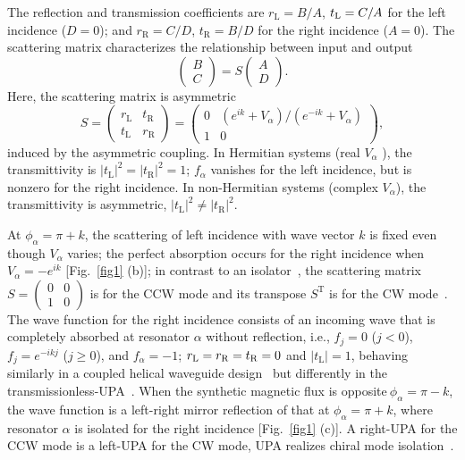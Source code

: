 \documentclass[prl,showpacs,superscriptaddress,twocolumn]{revtex4-1}
\begin{document}
The reflection and transmission coefficients are $r_{\mathrm{L}}=B/A$, $t_{%
\mathrm{L}}=C/A$ for the left incidence ($D=0$); and $r_{\mathrm{R}}=C/D$, $%
t_{\mathrm{R}}=B/D$ for the right incidence ($A=0$). The scattering matrix
characterizes the relationship between input and output~\cite{Jalas,CPAREV}
\begin{equation}
\left(
\begin{array}{c}
B \\
C%
\end{array}%
\right) =S\left(
\begin{array}{c}
A \\
D%
\end{array}%
\right) .  \label{S}
\end{equation}%
Here, the scattering matrix is asymmetric~\cite{Supplementary}
\begin{equation}
S=\left(
\begin{array}{cc}
r_{\mathrm{L}} & t_{\mathrm{R}} \\
t_{\mathrm{L}} & r_{\mathrm{R}}%
\end{array}%
\right) =\left(
\begin{array}{cc}
0 & \left( e^{ik}+V_{\alpha }\right) /\left( e^{-ik}+V_{\alpha }\right) \\
1 & 0%
\end{array}%
\right) ,  \label{S2}
\end{equation}%
induced by the asymmetric coupling. In Hermitian systems (real $V_{\alpha }$%
),
the transmittivity is $|t_{\mathrm{L}}|^2= |t_{\mathrm{R}}|^2=1$; $f_{\alpha}
$ vanishes for the left incidence, but is nonzero for the right incidence.
In non-Hermitian systems (complex $V_{\alpha }$), the transmittivity is
asymmetric, $|t_{\mathrm{L}}|^2\neq |t_{\mathrm{R}}|^2$.

At $\phi _{\alpha }=\pi +k$, the scattering of left incidence with wave
vector $k$ is fixed even though $V_{\alpha }$ varies; the perfect absorption
occurs for the right incidence when $V_{\alpha }=-e^{ik}$ [Fig.~\ref{fig1}%
(b)]; in contrast to an isolator~\cite{Jalas}, the scattering matrix $%
S=\left(
\begin{array}{cc}
0 & 0 \\
1 & 0%
\end{array}%
\right) $ is for the CCW mode and its transpose $S^{\mathrm{T}}$ is for the
CW mode~\cite{Supplementary}. The wave function for the right incidence
consists of an incoming wave that is completely absorbed at resonator $%
\alpha $ without reflection, i.e., $f_{j}=0$ ($j<0$), $f_{j}=e^{-ikj}$ ($%
j\geqslant 0$), and $f_{\alpha }=-1$; $r_{\mathrm{L}}=r_{\mathrm{R}}=t_{%
\mathrm{R}}=0$ and $\left\vert t_{\mathrm{L}}\right\vert =1$, behaving
similarly in a coupled helical waveguide design~\cite{LonghiOL} but
differently in the transmissionless-UPA~\cite{UPA}. When the synthetic
magnetic flux is opposite$\ \phi _{\alpha }=\pi -k$, the wave function is a
left-right mirror reflection of that at $\phi _{\alpha }=\pi +k$, where
resonator $\alpha $ is isolated for the right incidence [Fig.~\ref{fig1}%
(c)]. A right-UPA for the CCW mode is a left-UPA for the CW mode, UPA
realizes chiral mode isolation~\cite{ZYu,LBi,LFan}.
\end{document}
